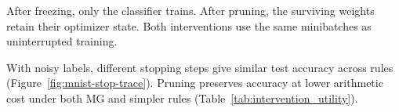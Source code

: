 {After freezing, only the classifier trains. After pruning, the surviving weights retain their optimizer state. Both interventions use the same minibatches as uninterrupted training.

\begin{table}[!htbp]
\centering\small
\caption{MNIST test accuracy (\%) and relative arithmetic cost across eight repeats.}
\label{tab:intervention_utility}

\end{table}

With noisy labels, different stopping steps give similar test accuracy across rules (Figure~\ref{fig:mnist-stop-trace}). Pruning preserves accuracy at lower arithmetic cost under both MG and simpler rules (Table~\ref{tab:intervention_utility}).
}
